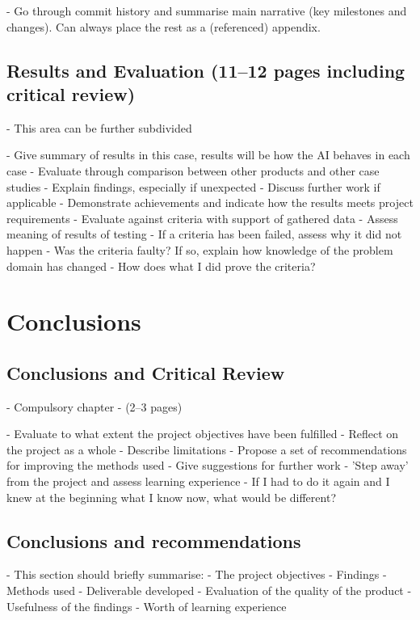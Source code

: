 \documentclass[11pt, a4paper]{article}
\begin{document}
- Go through commit history and summarise main narrative (key milestones and changes). Can always place the rest as a (referenced) appendix.

\subsection {Results and Evaluation (11--12 pages including critical review)}
\label{subsec:resultsAndEvaluation}

- This area can be further subdivided

- Give summary of results in this case, results will be how the AI behaves in each case
  - Evaluate through comparison between other products and other case studies
  - Explain findings, especially if unexpected
 - Discuss further work if applicable
- Demonstrate achievements and indicate how the results meets project requirements
  - Evaluate against criteria with support of gathered data
  - Assess meaning of results of testing 
    - If a criteria has been failed, assess why it did not happen 
      - Was the criteria faulty? If so, explain how knowledge of the problem domain has changed
    - How does what I did prove the criteria?

\section {Conclusions}
\label{sec:conclusions}

\subsection {Conclusions and Critical Review}
\label{subsec:conclusionsAndCriticalReview}

- Compulsory chapter
- (2--3 pages)

- Evaluate to what extent the project objectives have been fulfilled 
- Reflect on the project as a whole 
- Describe limitations 
  - Propose a set of recommendations for improving the methods used
  - Give suggestions for further work
- 'Step away' from the project and assess learning experience
  - If I had to do it again and I knew at the beginning what I know now, what would be different?

\subsection{Conclusions and recommendations}
\label{subsec:conclusionsAndRecommendations}

- This section should briefly summarise:
  - The project objectives
  - Findings
  - Methods used 
  - Deliverable developed
  - Evaluation of the quality of the product
  - Usefulness of the findings
  - Worth of learning experience

\printbibliography[
  heading=bibintoc,
  title={Bibliography}
]
\end{document}
